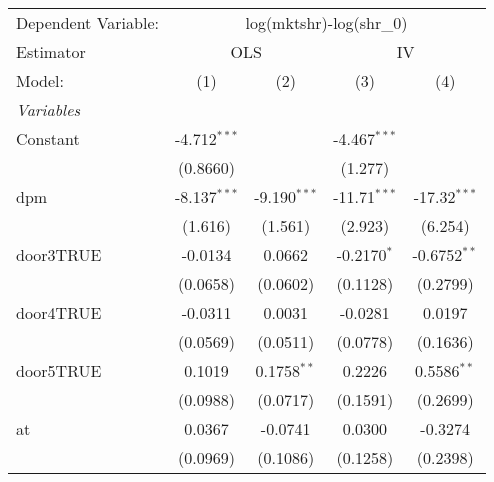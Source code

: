 
\begingroup
\centering
\begin{tabular}{lcccc}
   \tabularnewline \midrule \midrule
   Dependent Variable: & \multicolumn{4}{c}{log(mktshr)-log(shr\_0)}\\
   Estimator & \multicolumn{2}{c}{OLS} & \multicolumn{2}{c}{IV} \\ 
   Model:                                     & (1)             & (2)                    & (3)                    & (4)\\  
   \midrule
   \emph{Variables}\\
   Constant                                   & -4.712$^{***}$  &                        & -4.467$^{***}$         &   \\   
                                              & (0.8660)        &                        & (1.277)                &   \\   
   dpm                                        & -8.137$^{***}$  & -9.190$^{***}$         & -11.71$^{***}$         & -17.32$^{***}$\\   
                                              & (1.616)         & (1.561)                & (2.923)                & (6.254)\\   
   door3TRUE                                  & -0.0134         & 0.0662                 & -0.2170$^{*}$          & -0.6752$^{**}$\\   
                                              & (0.0658)        & (0.0602)               & (0.1128)               & (0.2799)\\   
   door4TRUE                                  & -0.0311         & 0.0031                 & -0.0281                & 0.0197\\   
                                              & (0.0569)        & (0.0511)               & (0.0778)               & (0.1636)\\   
   door5TRUE                                  & 0.1019          & 0.1758$^{**}$          & 0.2226                 & 0.5586$^{**}$\\   
                                              & (0.0988)        & (0.0717)               & (0.1591)               & (0.2699)\\   
   at                                         & 0.0367          & -0.0741                & 0.0300                 & -0.3274\\   
                                              & (0.0969)        & (0.1086)               & (0.1258)               & (0.2398)\\   

\end{tabular}
